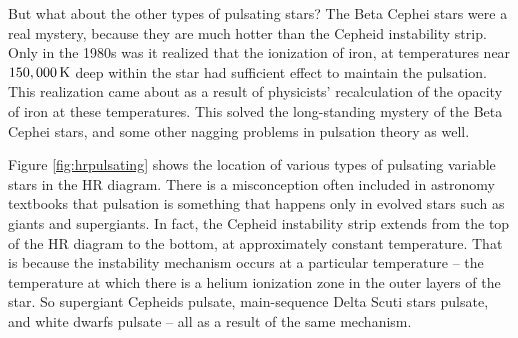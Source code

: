 \documentclass[a4paper,10pt]{article}
\begin{document}
{\noindent}But what about the other types of pulsating stars? The Beta Cephei stars were a real mystery, because they are much hotter than the Cepheid instability strip. Only in the 1980s was it realized that the ionization of iron, at temperatures near $150,000\,{\rm K}$ deep within the star had sufficient effect to maintain the pulsation. This realization came about as a result of physicists' recalculation of the opacity of iron at these temperatures. This solved the long-standing mystery of the Beta Cephei stars, and some other nagging problems in pulsation theory as well.

{\noindent}Figure \ref{fig:hrpulsating} shows the location of various types of pulsating variable stars in the HR diagram. There is a misconception often included in astronomy textbooks that pulsation is something that happens only in evolved stars such as giants and supergiants. In fact, the Cepheid instability strip extends from the top of the HR diagram to the bottom, at approximately constant temperature. That is because the instability mechanism occurs at a particular temperature -- the temperature at which there is a helium ionization zone in the outer layers of the star. So supergiant Cepheids pulsate, main-sequence Delta Scuti stars pulsate, and white dwarfs pulsate -- all as a result of the same mechanism.
\end{document}
